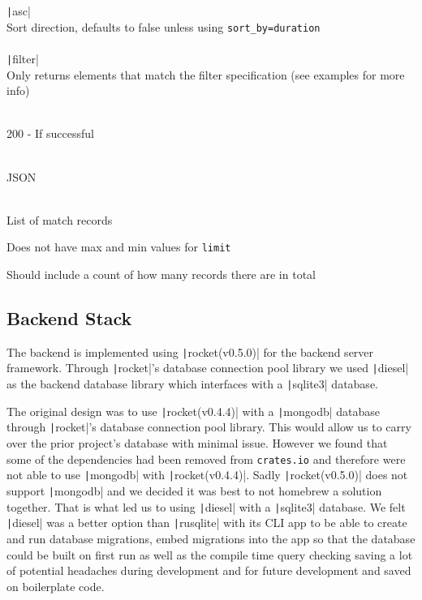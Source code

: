 \documentclass{article}
\begin{document}
\begin{description}
\begin{description}
    \texttt|asc| \\
    Sort direction, defaults to false unless using \texttt{sort_by=duration} \vspace{0.5em} \\ \\
    \texttt|filter| \\
    Only returns elements that match the filter specification (see examples for more info)
    \item[Response Status] \hfill \\
    200 - If successful
    \item[Response Body Format] \hfill \\
    JSON
    \item[Response Body] \hfill \\
    List of match records
    \item[Known Issues] 
    \item Does not have max and min values for \texttt{limit}
    \item Should include a count of how many records there are in total
  \end{description}
\end{description}

\subsection{Backend Stack}

The backend is implemented using \texttt|rocket(v0.5.0)| for the backend server framework. 
Through \texttt|rocket|'s database connection pool library we used \texttt|diesel|
as the backend database library which interfaces with a \texttt|sqlite3| database.

The original design was to use \texttt|rocket(v0.4.4)| with a \texttt|mongodb| database through \texttt|rocket|'s database connection pool library.
This would allow us to carry over the prior project's database with minimal issue.
However we found that some of the dependencies had been removed from \texttt{crates.io} and therefore were not able to use \texttt|mongodb| with \texttt|rocket(v0.4.4)|.
Sadly \texttt|rocket(v0.5.0)| does not support \texttt|mongodb| and we decided it was best to not homebrew a solution together.  That is what led us to using \texttt|diesel|
with a \texttt|sqlite3| database. We felt \texttt|diesel| was a better option than \texttt|rusqlite| with its CLI app to be able to create and run database migrations,
embed migrations into the app so that the database could be built on first run as well as the compile time query checking saving a lot of potential headaches during development and for future development and saved on boilerplate code.
\end{document}
